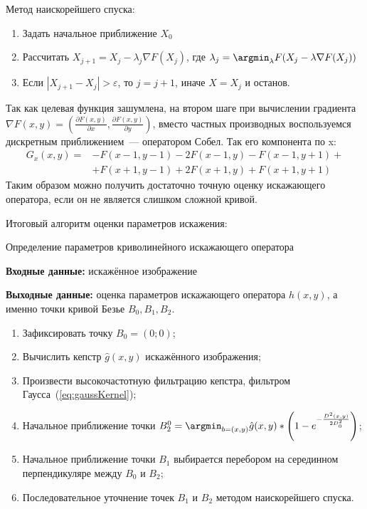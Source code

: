Метод наискорейшего спуска:
\begin{enumerate}
	\item Задать начальное приближение $X_0$
	\item Рассчитать $X_{j+1} = X_j - \lambda_j \nabla F(X_j)$, где $\lambda_j = \argmin_{\lambda} F(X_j - \lambda\nabla F(X_j))$
	\item Если $|X_{j+1}-X_j| > \varepsilon$, то $j = j+1$, иначе $X = X_j$ и останов.
\end{enumerate}

Так как целевая функция зашумлена, на втором шаге при вычислении градиента $\nabla F(x,y) = \left(\frac{\partial F(x,y)}{\partial x}, \frac{\partial F(x,y)}{\partial y}\right)$, вместо частных производных воспользуемся дискретным приближением~--- оператором Собел. Так его компонента по x:
\begin{equation*}
	\begin{aligned}
		G_x(x,y) = &-F(x-1, y-1) - 2F(x-1, y) - F(x-1, y+1) + \\
                   &+F(x+1, y-1) + 2F(x+1, y) + F(x+1, y+1)
	\end{aligned}
\end{equation*}
Таким образом можно получить достаточно точную оценку искажающего оператора, если он не является слишком сложной кривой.

Итоговый алгоритм оценки параметров искажения:
\begin{algorithm} Определение параметров криволинейного искажающего оператора
	
	\textbf{Входные данные:} искажённое изображение

	\textbf{Выходные данные:} оценка параметров искажающего оператора $h(x,y)$, а именно точки кривой Безье $B_0, B_1, B_2$.
	\begin{enumerate}
		\item Зафиксировать точку $B_0 = (0;0)$;
		\item Вычислить кепстр $\hat{g}(x,y)$ искажённого изображения;
		\item Произвести высокочастотную фильтрацию кепстра, фильтром Гаусса~(\ref{eq:gaussKernel});
		\item Начальное приближение точки $B_2^0 = \argmin_{b=(x,y)} \hat{g}(x,y)*\left(1 - e^{-\frac{D^2(x,y)}{2D_0^2}}\right)$;
		\item Начальное приближение точки $B_1$ выбирается перебором на серединном перпендикуляре между $B_0$ и $B_2$;
		\item Последовательное уточнение точек $B_1$ и $B_2$ методом наискорейшего спуска. 
	\end{enumerate}
	\label{algo:curve}
\end{algorithm}

